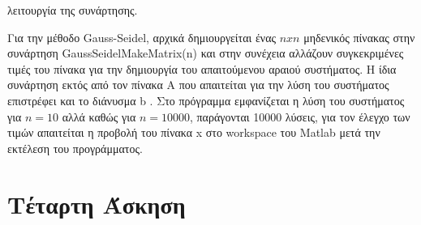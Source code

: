 \documentclass[a4paper,11pt]{article}
\newcommand{\lt}{\latintext}
\newcommand{\gt}{\greektext}
\begin{document}
λειτουργία της συνάρτησης. \par
Για την μέθοδο Gauss-Seidel, αρχικά δημιουργείται ένας $nxn$ μηδενικός 
πίνακας στην συνάρτηση \lt GaussSeidelMakeMatrix(n) \gt και στην συνέχεια
αλλάζουν συγκεκριμένες τιμές του πίνακα για την δημιουργία του απαιτούμενου
αραιού συστήματος. Η ίδια συνάρτηση εκτός από τον πίνακα Α που απαιτείται 
για την λύση του συστήματος επιστρέφει και το διάνυσμα \lt b 
\gt. Στο πρόγραμμα εμφανίζεται η λύση του συστήματος για $n=10$ αλλά καθώς 
για $n=10000$, παράγονται 10000 λύσεις, για τον έλεγχο των τιμών απαιτείται
η προβολή του πίνακα \lt x \gt στο \lt workspace \gt του \lt Matlab \gt μετά 
την εκτέλεση του προγράμματος.\\


\section{Τέταρτη Άσκηση}
\end{document}
